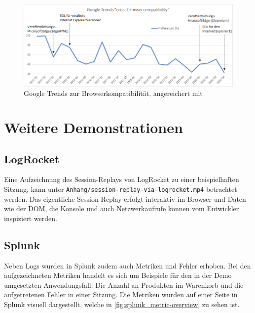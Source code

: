 \begin{figure}[H]
	\centering
	\includegraphics[width=0.84\linewidth]{img/99_postscript/google-trends_cross-browser-compatability.png}
	\caption{Google Trends zur Browserkompatibilität, angereichert mit \cite{MicrosoftIEandEdgeLifecycleFAQ}}
	\label{fig:google-search-trends_cross-browser-compatability}
\end{figure}

\section{Weitere Demonstrationen}

\subsection{LogRocket}
\label{sec:demo-logrocket}

Eine Aufzeichnung des Session-Replays von LogRocket zu einer beispielhaften Sitzung, kann unter \texttt{Anhang/session-replay-via-logrocket.mp4} betrachtet werden. Das eigentliche Session-Replay erfolgt interaktiv im Browser und Daten wie der DOM, die Konsole und auch Netzwerkaufrufe können vom Entwickler inspiziert werden.

\subsection{Splunk}
\label{sec:demo-splunk}

Neben Logs wurden in Splunk zudem auch Metriken und Fehler erhoben. Bei den aufgezeichneten Metriken handelt es sich um Beispiele für den in der Demo umgesetzten Anwendungsfall: Die Anzahl an Produkten im Warenkorb und die aufgetretenen Fehler in einer Sitzung. Die Metriken wurden auf einer Seite in Splunk visuell dargestellt, welche in \autoref{fig:splunk_metric-overview} zu sehen ist.

